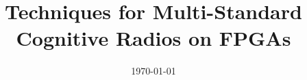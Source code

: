 \documentclass{ecsthesis}                %
\begin{document}
\frontmatter
\title      {Techniques for Multi-Standard Cognitive Radios on FPGAs}
\addresses  {\groupname\\\deptname\\\univname}
\date       {\today}
\subject    {}
\keywords   {}
\maketitle




%
\tableofcontents
\listoffigures
\listoftables
\renewcommand{\arraystretch}{1.5}

\end{document}
